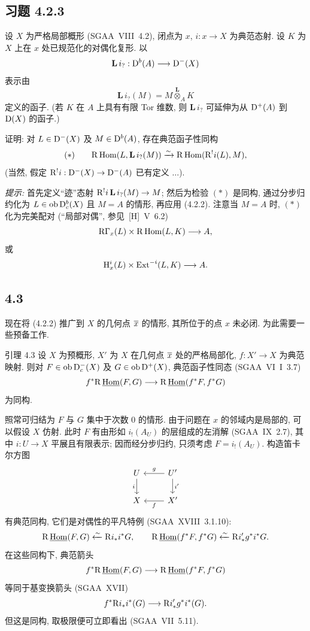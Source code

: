 \subsection*{习题 4.2.3}
设 $X$ 为严格局部概形 (SGAA~VIII~4.2), 闭点为 $x$, $i:x\to X$ 为典范态射. 设 $K$ 为 $X$ 上在 $x$ 处已规范化的对偶化复形. 以
\[
\mathbf L\, i_? : \mathrm{D}^b(A)\longrightarrow \mathrm{D}^-(X)
\]
表示由
\[
\mathbf L\, i_?(M)=M\overset{\mathbf L}{\otimes}_A K
\]
定义的函子.
(若 $K$ 在 $A$ 上具有有限 Tor 维数, 则 $\mathbf L\, i_?$ 可延伸为从 $\mathrm{D}^+(A)$ 到 $\mathrm{D}(X)$ 的函子.)

证明: 对 $L\in\mathrm{D}^-(X)$ 及 $M\in\mathrm{D}^b(A)$, 存在典范函子性同构
\[
(*)\qquad \mathrm R\operatorname{Hom}(L,\mathbf L\, i_?(M))\xrightarrow{\sim}\mathrm R\operatorname{Hom}(\mathrm R^{!}i(L),M),
\]
(当然, 假定 $\mathrm R^{!}i:\mathrm{D}^-(X)\to\mathrm{D}^-(A)$ 已有定义 $\dots$).

\emph{提示:} 首先定义“迹”态射 $\mathrm R^{!}i\,\mathbf L\, i_?(M)\to M$; 然后为检验 $(*)$ 是同构, 通过分步归约化为 $L\in\operatorname{ob}\mathrm{D}_c^b(X)$ 且 $M=A$ 的情形, 再应用 (4.2.2). 注意当 $M=A$ 时, $(*)$ 化为完美配对 (“局部对偶”, 参见~[H]~V~6.2)
\[
\mathrm R\Gamma_x(L)\times \mathrm R\operatorname{Hom}(L,K)\longrightarrow A,
\]
或
\[
\mathrm{H}_x^i(L)\times \operatorname{Ext}^{-i}(L,K)\longrightarrow A.
\]

\subsection*{4.3}
现在将 (4.2.2) 推广到 $X$ 的几何点 $\overline{x}$ 的情形, 其所位于的点 $x$ 未必闭. 为此需要一些预备工作.

\begin{statement}{引理 4.3}
设 $X$ 为预概形, $X'$ 为 $X$ 在几何点 $\overline{x}$ 处的严格局部化, $f:X'\to X$ 为典范映射. 则对 $F\in\operatorname{ob}\mathrm{D}_c^-(X)$ 及 $G\in\operatorname{ob}\mathrm{D}^+(X)$, 典范函子性同态 (SGAA~VI~I~3.7)
\[
f^*\mathrm R\,\underline{\operatorname{Hom}}(F,G)\longrightarrow \mathrm R\,\underline{\operatorname{Hom}}(f^*F,f^*G)
\]
为同构.
\end{statement}

\begin{prooftext}[证明]
照常可归结为 $F$ 与 $G$ 集中于次数 $0$ 的情形. 由于问题在 $x$ 的邻域内是局部的, 可以假设 $X$ 仿射. 此时 $F$ 有由形如 $i_!(A_U)$ 的层组成的左消解 (SGAA~IX~2.7), 其中 $i:U\to X$ 平展且有限表示; 因而经分步归约, 只须考虑 $F=i_!(A_U)$. 构造笛卡尔方图
\[
\begin{tikzcd}
U \arrow[d,"i"'] & U' \arrow[l,"g"'] \arrow[d,"i'"] \\
X & X' \arrow[l,"f"]
\end{tikzcd}
\]
有典范同构, 它们是对偶性的平凡特例 (SGAA~XVIII~3.1.10):
\[
\mathrm R\,\underline{\operatorname{Hom}}(F,G)\xleftarrow{\sim}\mathrm R i_* i^*G,
\qquad
\mathrm R\,\underline{\operatorname{Hom}}(f^*F,f^*G)\xleftarrow{\sim}\mathrm R i'_* g^*i^*G.
\]
在这些同构下, 典范箭头
\[
f^*\mathrm R\,\underline{\operatorname{Hom}}(F,G)\longrightarrow \mathrm R\,\underline{\operatorname{Hom}}(f^*F,f^*G)
\]
等同于基变换箭头 (SGAA~XVII)
\[
f^*\mathrm R i_*i^*(G)\longrightarrow \mathrm R i'_*g^*i^*(G).
\]
但这是同构, 取极限便可立即看出 (SGAA~VII~5.11).
\end{prooftext}

